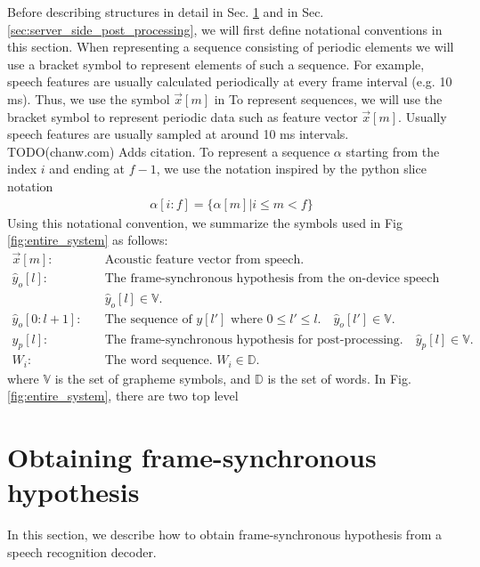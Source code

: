 \documentclass{article}
\begin{document}
Before describing structures in detail in Sec.
\ref{sec:frame_synchronous_hypothesis} and in Sec.
\ref{sec:server_side_post_processing}, we will first define notational 
conventions in this section. When representing a sequence consisting of 
periodic elements we will use a bracket symbol to represent elements of
such a sequence. For example, speech features are usually calculated 
periodically at every frame interval (e.g. 10 ms). Thus, we use  
the symbol $\vec{x}[m]$ in
To represent sequences, we will use the bracket symbol
to represent periodic data such as feature vector $\vec{x}[m]$. Usually
speech features are usually sampled at around 10 ms intervals. TODO(chanw.com)
Adds citation. To represent a sequence $\alpha$ starting from the index 
$i$ and ending at $f-1$, we use the notation inspired by the python slice 
notation 
\begin{align}
  \alpha[i:f] = \{ \alpha[m]| i \le m < f \} 
\end{align}
Using this notational convention, we summarize the symbols used in Fig
\ref{fig:entire_system} as follows:
\begin{align}
  \vec{x}[m]:& \quad \text{Acoustic feature vector from speech.}  \nonumber \\
  \hat{y}_o[l]:& \quad \text{The frame-synchronous hypothesis from the
  on-device speech recognizer.}   \nonumber \\
       & \quad \hat{y}_o[l] \in \mathbb{V}.  \nonumber \\
  \hat{y}_o[0:l+1]  : & \quad \text{The sequence of $y[l']$ where } 0 \le l'
  \le l. \quad  \hat{y}_o[l'] \in \mathbb{V}.  \nonumber \\ 
  y_p[l]:& \quad \text{The frame-synchronous hypothesis for post-processing.}
  \quad \hat{y}_p[l] \in \mathbb{V}.   \nonumber \\
  W_i: & \quad \text{The word sequence. } W_i \in  \mathbb{D}.  \nonumber 
\end{align}
where $\mathbb{V}$ is the set of grapheme symbols, and $\mathbb{D}$ is the
set of words. In Fig. \ref{fig:entire_system}, there are two top level


\section{Obtaining frame-synchronous hypothesis}
\label{sec:frame_synchronous_hypothesis}

In this section, we describe how to obtain frame-synchronous  
hypothesis from a speech recognition decoder. 
\end{document}
